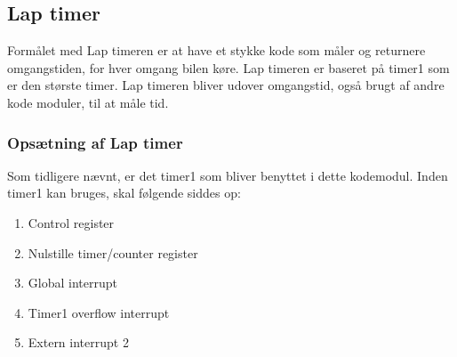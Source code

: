 \newpage

\subsection{Lap timer}
\label{lapt}
Formålet med Lap timeren er at have et stykke kode som måler og returnere omgangstiden, for hver omgang bilen køre. Lap timeren er baseret på timer1 som er den største timer. Lap timeren bliver udover omgangstid, også brugt af andre kode moduler, til at måle tid.
\subsubsection{Opsætning af Lap timer}
Som tidligere nævnt, er det timer1 som bliver benyttet i dette kodemodul. Inden timer1 kan bruges, skal følgende siddes op:
\begin{enumerate}
\item Control register
\item Nulstille timer/counter register
\item Global interrupt
\item Timer1 overflow interrupt
\item Extern interrupt 2
\end{enumerate}

